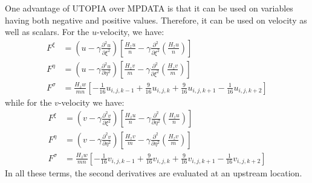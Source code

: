 One advantage of UTOPIA over MPDATA is that it can be used on
variables having both negative and positive values. Therefore,
it can be used on velocity as well as scalars.
For the $u$-velocity, we have:
\begin{align}
   F^\xi &= \left(u - \gamma \frac{\partial^2 u}{\partial \xi^2} \right)
   \left[ \frac{H_z u}{n} - \gamma \frac{\partial^2}{\partial \xi^2}
   \left( \frac{H_z u}{n} \right) \right] \\
   F^\eta &= \left(u - \gamma \frac{\partial^2 u}{\partial \eta^2}
     \right)
   \left[ \frac{H_z v}{m} - \gamma \frac{\partial^2}{\partial \xi^2}
   \left( \frac{H_z v}{m} \right) \right] \\
   F^\sigma &= \frac{H_z w}{mn} \left[
     - \frac{1}{16} u_{i,j,k-1} + \frac{9}{16} u_{i,j,k} +
       \frac{9}{16} u_{i,j,k+1} - \frac{1}{16} u_{i,j,k+2} \right]
\end{align}
while for the $v$-velocity we have:
\begin{align}
   F^\xi &= \left(v - \gamma \frac{\partial^2 v}{\partial \xi^2} \right)
   \left[ \frac{H_z u}{n} - \gamma \frac{\partial^2}{\partial \eta^2}
   \left( \frac{H_z u}{n} \right) \right] \\
   F^\eta &= \left(v - \gamma \frac{\partial^2 v}{\partial \eta^2}
     \right)
   \left[ \frac{H_z v}{m} - \gamma \frac{\partial^2}{\partial \eta^2}
   \left( \frac{H_z v}{m} \right) \right] \\
   F^\sigma &= \frac{H_z w}{mn} \left[
     - \frac{1}{16} v_{i,j,k-1} + \frac{9}{16} v_{i,j,k} +
       \frac{9}{16} v_{i,j,k+1} - \frac{1}{16} v_{i,j,k+2} \right]
\end{align}
In all these terms, the second derivatives are evaluated at an upstream
location.

